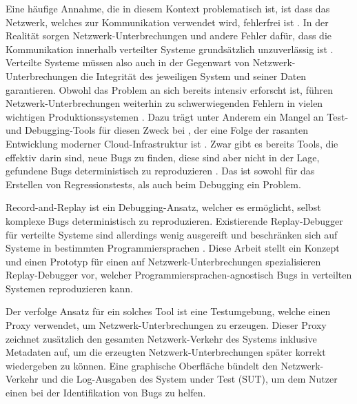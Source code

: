 \documentclass[12pt,a4paper]{report}
\begin{document}
Eine häufige Annahme, die in diesem Kontext problematisch ist, ist dass das Netzwerk, welches zur Kommunikation verwendet wird,
fehlerfrei ist \cite{brief_introduction_to_distributed_systems}. In der Realität sorgen Netzwerk-Unterbrechungen und andere Fehler
dafür, dass die Kommunikation innerhalb verteilter Systeme grundsätzlich unzuverlässig ist \cite{distributed_systems_book,
	distributed_systems_concepts_and_design}. Verteilte Systeme müssen also auch in der Gegenwart von Netzwerk-Unterbrechungen die
Integrität des jeweiligen System und seiner Daten garantieren. Obwohl das Problem an sich bereits intensiv erforscht ist, führen
Netzwerk-Unterbrechungen weiterhin zu schwerwiegenden Fehlern in vielen wichtigen Produktionssystemen
\cite{analysis_of_network_partition_failures}. Dazu trägt unter Anderem ein Mangel an Test- und Debugging-Tools für diesen Zweck
bei \cite{failify_paper,simple_testing_can_prevent}, der eine Folge der rasanten Entwicklung moderner Cloud-Infrastruktur ist
\cite{why_does_cloud_stop_computing}.
Zwar gibt es bereits Tools, die effektiv darin sind, neue Bugs zu finden, diese sind aber nicht in der Lage, gefundene Bugs
deterministisch zu reproduzieren \cite{failify_paper}. Das ist sowohl für das Erstellen von Regressionstests, als auch beim Debugging
ein Problem.


Record-and-Replay ist ein Debugging-Ansatz, welcher es ermöglicht, selbst komplexe Bugs deterministisch zu reproduzieren.
Existierende Replay-Debugger für verteilte Systeme sind allerdings wenig ausgereift und beschränken sich auf Systeme in bestimmten
Programmiersprachen \cite{distributed_replay_debugging_1997,distributed_replay_debugging_2006}. Diese Arbeit stellt ein Konzept
und einen Prototyp für einen auf Netzwerk-Unterbrechungen spezialisieren Replay-Debugger vor, welcher
Programmiersprachen-agnostisch Bugs in verteilten Systemen reproduzieren kann.


Der verfolge Ansatz für ein solches Tool ist eine Testumgebung, welche einen Proxy verwendet, um Netzwerk-Unterbrechungen zu
erzeugen. Dieser Proxy zeichnet zusätzlich den gesamten Netzwerk-Verkehr des Systems inklusive Metadaten auf, um die erzeugten
Netzwerk-Unterbrechungen später korrekt wiedergeben zu können. Eine graphische Oberfläche bündelt den Netzwerk-Verkehr und die
Log-Ausgaben des System under Test (SUT), um dem Nutzer einen bei der Identifikation von Bugs zu helfen.
\end{document}
